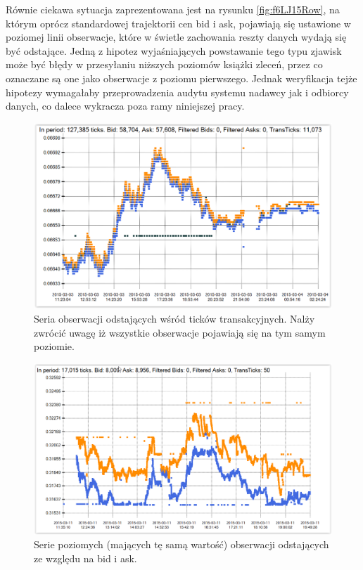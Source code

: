 \documentclass[a4paper,12pt,openany, DIV=calc, headsepline]{scrbook}
\begin{document}
Równie ciekawa sytuacja zaprezentowana jest na rysunku \ref{fig:f6LJ15Row}, na którym oprócz standardowej trajektorii cen bid i ask, pojawiają się ustawione w poziomej linii obserwacje, które w świetle zachowania reszty danych wydają się być odstające. Jedną z hipotez wyjaśniających powstawanie tego typu zjawisk może być błędy w przesyłaniu niższych poziomów książki zleceń, przez co oznaczane są one jako obserwacje z poziomu pierwszego. Jednak weryfikacja tejże hipotezy wymagałaby przeprowadzenia audytu systemu nadawcy jak i odbiorcy danych, co dalece wykracza poza ramy niniejszej pracy.

\begin{figure}[H]
  \centering
  \includegraphics[scale=0.5]{wykresy/f6mh15.PNG}
  \caption{Seria obserwacji odstających wśród ticków transakcyjnych. Nalży zwrócić uwagę iż wszystkie obserwacje pojawiają się na tym samym poziomie.}
  \label{fig:f6mh15}
\end{figure}

\begin{figure}[H]
  \centering
  \includegraphics[scale=0.5]{wykresy/f6LJ15Row.PNG}
  \caption{Serie poziomych (mających tę samą wartość) obserwacji odstających ze względu na bid i ask.}
  \label{fig:f6mh15}
\end{figure}
\end{document}
